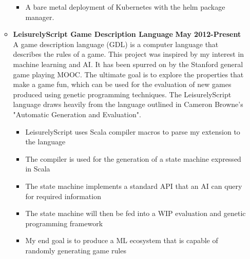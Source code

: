 \documentclass[overlapped]{res}
\begin{document}
\begin{resume}
\begin{itemize}[leftmargin=0in]
\begin{itemize}[leftmargin=0in]
\begin{samepage}
\begin{itemize}
                        \item[\textbullet] A bare metal deployment of Kubernetes with the helm package manager.
                    \end{itemize}
                \end{samepage}
            \item[] 
                \begin{samepage}
                    \textbf{LeisurelyScript Game Description Language} \hfill \textbf{May 2012-Present} \\
                    A game description language (GDL) is a computer language that describes the rules of a game. 
                    This project was inspired by my interest in machine learning and AI. It has been spurred on by the 
                    Stanford general game playing MOOC. The ultimate goal is to explore the properties that make a game
                    fun, which can be used for the evaluation of new games produced using genetic programming techniques. 
                    The LeisurelyScript language draws heavily from the language 
                    outlined in Cameron Browne's "Automatic Generation and Evaluation".
                    \begin{itemize}
                        \item[\textbullet] LeisurelyScript uses Scala compiler macros to parse my extension to the language 
                        \item[\textbullet] The compiler is used for the generation of a state machine expressed in Scala 
                        \item[\textbullet] The state machine implements a standard API that an AI can query for required information
                        \item[\textbullet] The state machine will then be fed into a WIP evaluation and genetic programming framework
                        \item[\textbullet] My end goal is to produce a ML ecosystem that is capable of randomly generating game rules

                    \end{itemize}
                \end{samepage}
        \end{itemize}
\end{itemize}
\vspace{0.25in}



\end{resume}
\end{document}
